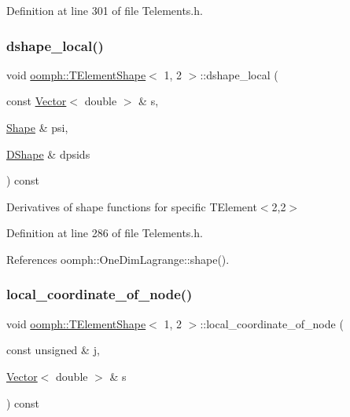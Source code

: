 Definition at line 301 of file Telements.\+h.

\mbox{\label{classoomph_1_1TElementShape_3_011_00_012_01_4_a8e49a6b8e66631cd281906d143bba607}} 
\subsubsection{\texorpdfstring{dshape\+\_\+local()}{dshape\_local()}}
{\footnotesize\ttfamily void \hyperlink{classoomph_1_1TElementShape}{oomph\+::\+T\+Element\+Shape}$<$ 1, 2 $>$\+::dshape\+\_\+local (\begin{DoxyParamCaption}\item[{const \hyperlink{classoomph_1_1Vector}{Vector}$<$ double $>$ \&}]{s,  }\item[{\hyperlink{classoomph_1_1Shape}{Shape} \&}]{psi,  }\item[{\hyperlink{classoomph_1_1DShape}{D\+Shape} \&}]{dpsids }\end{DoxyParamCaption}) const\hspace{0.3cm}{\ttfamily [inline]}}



Derivatives of shape functions for specific T\+Element$<$2,2$>$ 



Definition at line 286 of file Telements.\+h.



References oomph\+::\+One\+Dim\+Lagrange\+::shape().

\mbox{\label{classoomph_1_1TElementShape_3_011_00_012_01_4_a2c4eb1303f476287300c0d70144e7378}} 
\subsubsection{\texorpdfstring{local\+\_\+coordinate\+\_\+of\+\_\+node()}{local\_coordinate\_of\_node()}}
{\footnotesize\ttfamily void \hyperlink{classoomph_1_1TElementShape}{oomph\+::\+T\+Element\+Shape}$<$ 1, 2 $>$\+::local\+\_\+coordinate\+\_\+of\+\_\+node (\begin{DoxyParamCaption}\item[{const unsigned \&}]{j,  }\item[{\hyperlink{classoomph_1_1Vector}{Vector}$<$ double $>$ \&}]{s }\end{DoxyParamCaption}) const\hspace{0.3cm}{\ttfamily [inline]}}




